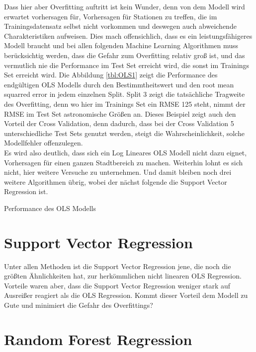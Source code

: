 \documentclass[a4paper,12pt]{thesis}
\begin{document}
Dass hier aber Overfitting auftritt ist kein Wunder, denn von dem Modell wird erwartet vorhersagen für, Vorhersagen für Stationen zu treffen, die im Trainingsdatensatz selbst nicht vorkommen und deswegen auch abweichende Charakteristiken aufweisen. Dies mach offensichlich, dass es ein leistungsfähigeres Modell braucht und bei allen folgenden Machine Learning Algorithmen muss berücksichtig werden, dass die Gefahr zum Overfitting relativ groß ist, und das vermutlich nie die Performance im Test Set erreicht wird, die sonst im Trainings Set erreicht wird. Die Abbildung \ref{tbl:OLS1} zeigt die Performance des endgültigen OLS Modells durch den Bestimmtheitswert und den root mean squarred error in jedem einzelnen Split. Split 3 zeigt die tatsächliche Tragweite des Overfitting, denn wo hier im Trainings Set ein RMSE 125 steht, nimmt der RMSE im Test Set astronomische Größen an. Dieses Beispiel zeigt auch den Vorteil der Cross Validation, denn dadurch, dass bei der Cross Validation 5 unterschiedliche Test Sets genutzt werden, steigt die Wahrscheinlichkeit, solche Modellfehler offenzulegen.\\
Es wird also deutlich, dass sich ein Log Lineares OLS Modell nicht dazu eignet, Vorhersagen für einen ganzen Stadtbereich zu machen. Weiterhin lohnt es sich nicht, hier weitere Versuche zu unternehmen. Und damit bleiben noch drei weitere Algorithmen übrig, wobei der nächst folgende die Support Vector Regression ist.

\begin{table}
	\caption{Performance des OLS Modells}
	\label{tbl:OLS1}
\end{table}

\section{Support Vector Regression}

Unter allen Methoden ist die Support Vector Regression jene, die noch die größten Ähnlichkeiten hat, zur herkömmlichen nicht linearen OLS Regression. Vorteile waren aber, dass die Support Vector Regression weniger stark auf Ausreißer reagiert als die OLS Regression. Kommt dieser Vorteil dem Modell zu Gute und minimiert die Gefahr des Overfittings?

\section{Random Forest Regression}
\end{document}
